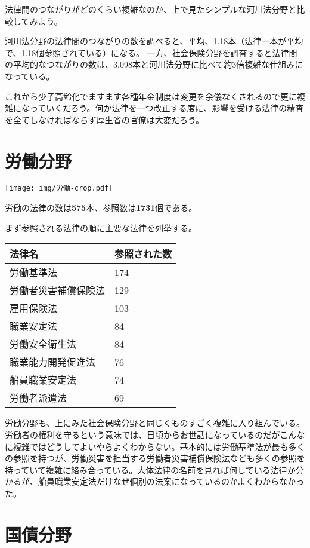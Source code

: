 \documentclass[a5j,openany,twoside]{jsbook}
\begin{document}
法律間のつながりがどのくらい複雑なのか、上で見たシンプルな河川法分野と比較してみよう。

河川法分野の法律間のつながりの数を調べると、平均、1.18本（法律一本が平均で、1.18個参照されている）になる。
一方、社会保険分野を調査すると法律間の平均的なつながりの数は、3.098本と河川法分野に比べて約3倍複雑な仕組みになっている。

これから少子高齢化でますます各種年金制度は変更を余儀なくされるので更に複雑になっていくだろう。何か法律を一つ改正する度に、影響を受ける法律の精査を全てしなければならず厚生省の官僚は大変だろう。

\section{労働分野}

\texttt{[image: img/労働-crop.pdf]}

労働の法律の数は\textbf{575}本、参照数は\textbf{1731}個である。

まず参照される法律の順に主要な法律を列挙する。

\begin{table}[htb]
  \begin{tabular}{|l|l|}  \hline
法律名 & 参照された数 \\ \hline \hline
労働基準法 & 174 \\
労働者災害補償保険法 & 129 \\
雇用保険法 & 103 \\
職業安定法 & 84 \\
労働安全衛生法 & 84 \\
職業能力開発促進法 & 76 \\
船員職業安定法 & 74 \\
労働者派遣法 & 69 \\ \hline
  \end{tabular}
\end{table}

労働分野も、上にみた社会保険分野と同じくものすごく複雑に入り組んでいる。労働者の権利を守るという意味では、日頃からお世話になっているのだがこんなに複雑ではどうしてよいやらよくわからない。基本的には労働基準法が最も多くの参照を持つが、労働災害を担当する労働者災害補償保険法なども多くの参照を持っていて複雑に絡み合っている。大体法律の名前を見れば何している法律か分かるが、船員職業安定法だけなぜ個別の法案になっているのかよくわからなかった。

\section{国債分野}
\end{document}
